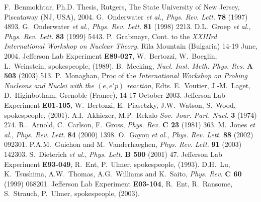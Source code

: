 \documentclass{elsart}
\begin{document}
\begin{thebibliography}{99}
%
F.~Benmokhtar, Ph.D. Thesis, Rutgers, The State University of New Jersey, 
Piscataway (NJ, USA), 2004.
%
G.~Onderwater {\it et al.}, {\it Phys. Rev. Lett.} {\bf 78} (1997) 4893.
%
G.~Onderwater {\it et al.}, {\it Phys. Rev. Lett.} {\bf 81} (1998) 2213.
%
D.L.~Groep {\it et al.}, {\it Phys. Rev. Lett.} {\bf 83} (1999) 5443.
%
P.~Grabmayr, Cont. to the {\it XXIIIrd International Workshop on
Nuclear Theory}, Rila Mountain (Bulgaria) 14-19 June, 2004.
%
Jefferson Lab Experiment {\bf E89-027}, W.~Bertozzi, W.~Boeglin, L.~Weinstein, 
spokespeople, (1989).
%
B.~Mecking, {\it Nucl. Inst. Meth. Phys. Res.} {\bf A 503} (2003) 513.
%
P.~Monaghan, Proc of the {\it International Workshop on Probing Nucleons and 
Nuclei with the $(e,e'p)$ reaction}, Edts. E.~Voutier, J.-M.~Laget, 
D.~Higinbotham, Grenoble (France), 14-17 October 2003.
%
Jefferson Lab Experiment {\bf E01-105}, W.~Bertozzi, E.~Piasetzky, 
J.W.~Watson, S.~Wood, spokespeople, (2001).
%
A.I.~Akhiezer, M.P.~Rekalo {\it Sov. Jour. Part. Nucl.} {\bf 3} (1974) 274.
%
R..~Arnold, C.~Carlson, F.~Gross, {\it Phys. Rev.} {\bf C 23} (1981) 363.
%
M.~Jones {\it et al.}, {\it Phys. Rev. Lett.} {\bf 84} (2000) 1398.
%
O.~Gayou {\it et al.}, {\it Phys. Rev. Lett.} {\bf 88} (2002) 092301.
%
P.A.M.~Guichon and M.~Vanderhaeghen, {\it Phys. Rev. Lett.} {\bf 91} (2003) 
142303.
%
S.~Dieterich {\it et al.}, {\it Phys. Lett.} {\bf B 500} (2001) 47.
%
Jefferson Lab Experiment {\bf E93-049}, R.~Ent, P.~Ulmer, spokespeople, (1993).
%
D.H.~Lu, K.~Tsushima, A.W.~Thomas, A.G.~Williams and K.~Saito, {\it Phys. Rev.} 
{\bf C 60} (1999) 068201.
%
Jefferson Lab Experiment {\bf E03-104}, R.~Ent, R.~Ransome, S.~Strauch, 
P.~Ulmer, spokespeople, (2003).
%
\end{thebibliography}
%
%
\end{document}
